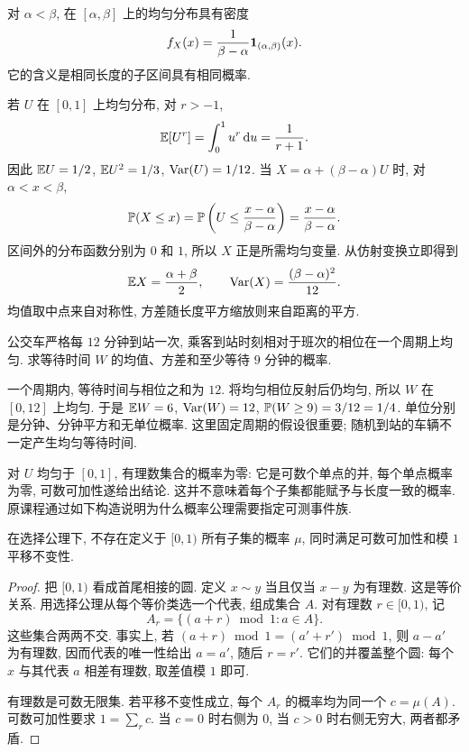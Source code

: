 
\begin{definition}[均匀分布]
对 $\alpha<\beta$, 在 $[\alpha,\beta]$ 上的均匀分布具有密度
\[
 f_X(x)=\frac1{\beta-\alpha}\mathbf 1_{(\alpha,\beta)}(x).
\]
它的含义是相同长度的子区间具有相同概率.
\end{definition}

若 $U$ 在 $[0,1]$ 上均匀分布, 对 $r>-1$,
\[
 \mathbb E[U^r]=\int_0^1 u^r\,\mathrm d u=\frac1{r+1}.
\]
因此 $\mathbb E U=1/2$, $\mathbb E U^2=1/3$, $\operatorname{Var}(U)=1/12$. 当 $X=\alpha+(\beta-\alpha)U$ 时, 对 $\alpha<x<\beta$,
\[
 \mathbb P(X\le x)=\mathbb P\left(U\le\frac{x-\alpha}{\beta-\alpha}\right)
 =\frac{x-\alpha}{\beta-\alpha}.
\]
区间外的分布函数分别为 $0$ 和 $1$, 所以 $X$ 正是所需均匀变量. 从仿射变换立即得到
\[
 \mathbb E X=\frac{\alpha+\beta}{2},\qquad
 \operatorname{Var}(X)=\frac{(\beta-\alpha)^2}{12}.
\]
均值取中点来自对称性, 方差随长度平方缩放则来自距离的平方.

\begin{example}
公交车严格每 $12$ 分钟到站一次, 乘客到站时刻相对于班次的相位在一个周期上均匀. 求等待时间 $W$ 的均值、方差和至少等待 $9$ 分钟的概率.
\end{example}
\begin{solution}
一个周期内, 等待时间与相位之和为 $12$. 将均匀相位反射后仍均匀, 所以 $W$ 在 $[0,12]$ 上均匀. 于是 $\mathbb E W=6$, $\operatorname{Var}(W)=12$, $\mathbb P(W\ge9)=3/12=1/4$. 单位分别是分钟、分钟平方和无单位概率. 这里固定周期的假设很重要; 随机到站的车辆不一定产生均匀等待时间.
\end{solution}

对 $U$ 均匀于 $[0,1]$, 有理数集合的概率为零: 它是可数个单点的并, 每个单点概率为零, 可数可加性遂给出结论. 这并不意味着每个子集都能赋予与长度一致的概率. 原课程通过如下构造说明为什么概率公理需要指定可测事件族.

\begin{proposition}[不能给所有子集赋予平移不变的长度]
在选择公理下, 不存在定义于 $[0,1)$ 所有子集的概率 $\mu$, 同时满足可数可加性和模 $1$ 平移不变性.
\end{proposition}
\begin{proof}
把 $[0,1)$ 看成首尾相接的圆. 定义 $x\sim y$ 当且仅当 $x-y$ 为有理数. 这是等价关系. 用选择公理从每个等价类选一个代表, 组成集合 $A$. 对有理数 $r\in[0,1)$, 记
\[
 A_r=\{(a+r)\bmod1:a\in A\}.
\]
这些集合两两不交. 事实上, 若 $(a+r)\bmod1=(a'+r')\bmod1$, 则 $a-a'$ 为有理数, 因而代表的唯一性给出 $a=a'$, 随后 $r=r'$. 它们的并覆盖整个圆: 每个 $x$ 与其代表 $a$ 相差有理数, 取差值模 $1$ 即可.

有理数是可数无限集. 若平移不变性成立, 每个 $A_r$ 的概率均为同一个 $c=\mu(A)$. 可数可加性要求 $1=\sum_r c$. 当 $c=0$ 时右侧为 $0$, 当 $c>0$ 时右侧无穷大, 两者都矛盾.
\end{proof}

